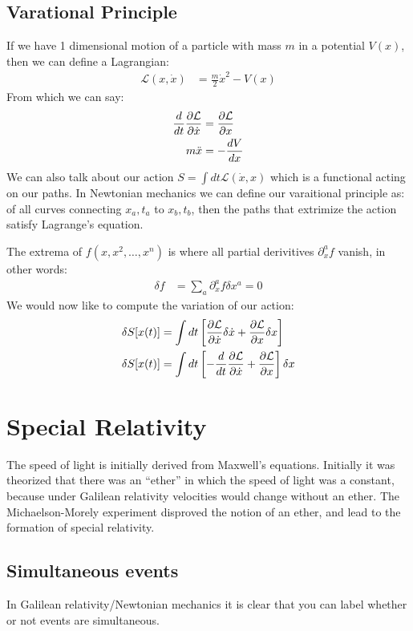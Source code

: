 \subsection{Varational Principle}
If we have 1 dimensional motion of a particle with mass $m$ in a potential $V(x)$, then we can define a Lagrangian:
\begin{align*}
	\mathcal{L}(x,\dot{x}) &= \frac{m}{2}\dot{x}^2  - V(x)
\end{align*}
From which we can say:
\begin{align*}
	\frac{d}{dt} \frac{\partial \mathcal{L}}{\partial \dot{x}} &= \frac{\partial \mathcal{L}}{\partial x} \\
	m\ddot{x} &= -\frac{dV}{dx}
\end{align*}
We can also talk about our action $S = \int dt \mathcal{L}(\dot{x},x)$ which is a functional acting on our paths.
In Newtonian mechanics we can define our varaitional principle as: of all curves connecting $x_a,t_a$ to $x_b,t_b$, then the paths that extrimize the action satisfy Lagrange's equation.

The extrema of $f(x,x^2,\ldots,x^n)$ is where all partial derivitives $\partial_x^a f$ vanish, in other words:
\begin{align*}
	\delta f  &= \sum_a \partial_x^a f \delta x^a = 0
\end{align*}
We would now like to compute the variation of our action:
\begin{align*}
	\delta S[x(t)] &= \int dt \left[\frac{\partial \mathcal{L}}{\partial \dot{x}} \delta \dot{x} + \frac{\partial \mathcal{L}}{\partial x}\delta x\right] \\
	\delta S[x(t)] &= \int dt \left[- \frac{d}{dt}\frac{\partial \mathcal{L}}{\partial \dot{x}} + \frac{\partial \mathcal{L}}{\partial x}\right]\delta x
\end{align*}

\section{Special Relativity}
The speed of light is initially derived from Maxwell's equations. Initially it was theorized that there was an ``ether'' in which the speed of light was a constant, because under Galilean relativity velocities would change without an ether.
The Michaelson-Morely experiment disproved the notion of an ether, and lead to the formation of special relativity.

\subsection{Simultaneous events}
In Galilean relativity/Newtonian mechanics it is clear that you can label whether or not events are simultaneous.

